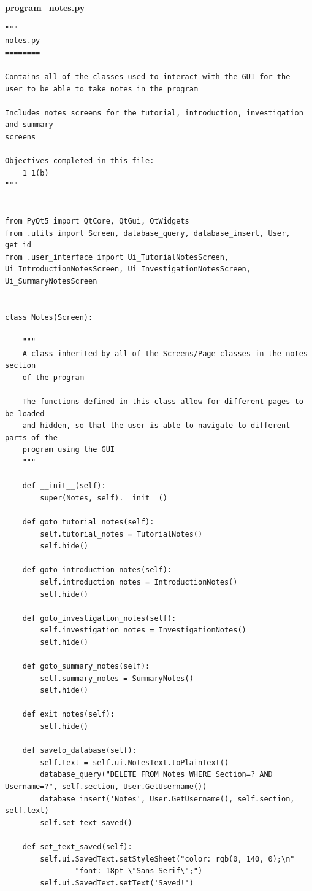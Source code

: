 \documentclass{article}
\begin{document}
\textbf{program\_notes.py}
\begin{lstlisting}
"""
notes.py
========

Contains all of the classes used to interact with the GUI for the
user to be able to take notes in the program

Includes notes screens for the tutorial, introduction, investigation and summary
screens

Objectives completed in this file:
    1 1(b)
"""


from PyQt5 import QtCore, QtGui, QtWidgets
from .utils import Screen, database_query, database_insert, User, get_id
from .user_interface import Ui_TutorialNotesScreen, Ui_IntroductionNotesScreen, Ui_InvestigationNotesScreen, Ui_SummaryNotesScreen


class Notes(Screen):

    """
    A class inherited by all of the Screens/Page classes in the notes section
    of the program

    The functions defined in this class allow for different pages to be loaded
    and hidden, so that the user is able to navigate to different parts of the
    program using the GUI
    """

    def __init__(self):
        super(Notes, self).__init__()

    def goto_tutorial_notes(self):
        self.tutorial_notes = TutorialNotes()
        self.hide()

    def goto_introduction_notes(self):
        self.introduction_notes = IntroductionNotes()
        self.hide()

    def goto_investigation_notes(self):
        self.investigation_notes = InvestigationNotes()
        self.hide()

    def goto_summary_notes(self):
        self.summary_notes = SummaryNotes()
        self.hide()

    def exit_notes(self):
        self.hide()

    def saveto_database(self):
        self.text = self.ui.NotesText.toPlainText()
        database_query("DELETE FROM Notes WHERE Section=? AND Username=?", self.section, User.GetUsername())
        database_insert('Notes', User.GetUsername(), self.section, self.text)
        self.set_text_saved()

    def set_text_saved(self):
        self.ui.SavedText.setStyleSheet("color: rgb(0, 140, 0);\n"
                "font: 18pt \"Sans Serif\";")
        self.ui.SavedText.setText('Saved!')


\end{lstlisting}
\end{document}
